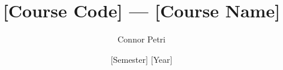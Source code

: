 \documentclass[12pt, letterpaper]{article}
\title{[Course Code] --- [Course Name]}
\author{Connor Petri}
\date{[Semester] [Year]}
\begin{document}
\maketitle
\pagebreak
\tableofcontents
\pagebreak
\end{document}
